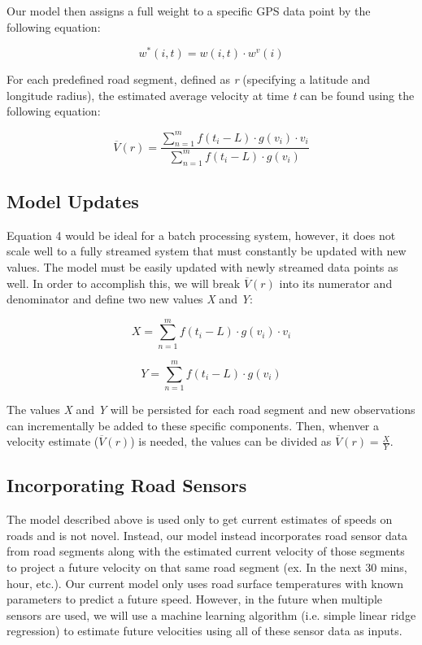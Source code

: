 \documentclass{vldb}
\begin{document}
Our model then assigns a full weight to a specific GPS data point by the following equation:

\begin{equation}w^*(i,t)=w(i,t) \cdot w^v(i) \end{equation}

For each predefined road segment, defined as \textit{r} (specifying a latitude and longitude radius), the estimated average velocity at time \textit{t} can be found using the following equation:

\begin{equation}\overline{V}(r)=\frac{\sum_{n=1}^{m} f(t_i - L) \cdot g(v_i) \cdot v_i}{\sum_{n=1}^{m} f(t_i - L) \cdot g(v_i)}\end{equation}


\subsection{Model Updates}

Equation 4 would be ideal for a batch processing system, however, it does not scale well to a fully streamed system that must constantly be updated with new values. The model must be easily updated with newly streamed data points as well. In order to accomplish this, we will break $\overline{V}(r)$ into its numerator and denominator and define two new values \textit{X} and \textit{Y}:

\begin{equation}X = \sum_{n=1}^{m} f(t_i - L) \cdot g(v_i) \cdot v_i\end{equation}

\begin{equation}Y = \sum_{n=1}^{m} f(t_i - L) \cdot g(v_i)\end{equation}

The values \textit{X} and \textit{Y} will be persisted for each road segment and new observations can incrementally be added to these specific components. Then, whenver a velocity estimate ($\overline{V}(r)$) is needed, the values can be divided as $\overline{V}(r)=\frac{X}{Y}$.


\subsection{Incorporating Road Sensors}
The model described above is used only to get current estimates of speeds on roads and is not novel. Instead, our model instead incorporates road sensor data from road segments along with the estimated current velocity of those segments to project a future velocity on that same road segment (ex. In the next 30 mins, hour, etc.). Our current model only uses road surface temperatures with known parameters to predict a future speed. However, in the future when multiple sensors are used, we will use a machine learning algorithm (i.e. simple linear ridge regression) to estimate future velocities using all of these sensor data as inputs. 
\end{document}
